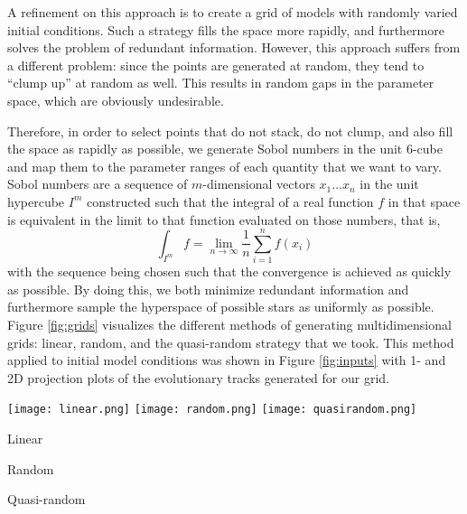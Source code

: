 \documentclass[manuscript,linenumbers]{aastex6}
\begin{document}
A refinement on this approach is to create a grid of models with randomly varied initial conditions. Such a strategy fills the space more rapidly, and furthermore solves the problem of redundant information. However, this approach suffers from a different problem: since the points are generated at random, they tend to ``clump up'' at random as well. This results in random gaps in the parameter space, which are obviously undesirable. 

Therefore, in order to select points that do not stack, do not clump, and also fill the space as rapidly as possible, we generate Sobol numbers \citep{sobol1967distribution} in the unit 6-cube and map them to the parameter ranges of each quantity that we want to vary. Sobol numbers are a sequence of $m$-dimensional vectors $x_1 \ldots x_n$ in the unit hypercube $I^m$ constructed such that the integral of a real function $f$ in that space is equivalent in the limit to that function evaluated on those numbers, that is,
\begin{equation}
    \int_{I^m} f = \lim_{n \to \infty} \frac{1}{n}\sum_{i=1}^n f(x_i)
\end{equation}
with the sequence being chosen such that the convergence is achieved as quickly as possible. By doing this, we both minimize redundant information and furthermore sample the hyperspace of possible stars as uniformly as possible. Figure \ref{fig:grids} visualizes the different methods of generating multidimensional grids: linear, random, and the quasi-random strategy that we took. This method applied to initial model conditions was shown in Figure \ref{fig:inputs} with 1- and 2D projection plots of the evolutionary tracks generated for our grid. 

\begin{figure*}
    \centering
    \texttt{[image: linear.png]}\hfill
    \texttt{[image: random.png]}\hfill
    \texttt{[image: quasirandom.png]}\\
    \parbox{0.32\textwidth}{\centering Linear}\hfill
    \parbox{0.32\textwidth}{\centering Random}\hfill
    \parbox{0.32\textwidth}{\centering Quasi-random}
    \caption{Results of different methods for generating multidimensional grids portrayed via a unit cube projected onto a unit square. Linear (left), random (middle), and quasi-random (right) grids are generated in three dimensions, with color depicting the third dimension, i.e., the distance between the reader and the screen. From top to bottom, all three methods are shown with 100, 400, and 2000 points generated, respectively. }%
    \label{fig:grids}
\end{figure*}
\end{document}
